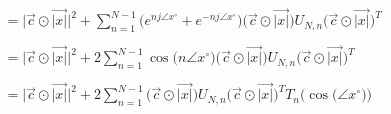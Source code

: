 \documentclass{article}
\begin{document}
\begin{align*}
                          &= \Big|\vec{c} \odot \vec{|x|}\Big|^{2} + \sum_{n=1}^{N - 1}\Big(e^{nj\angle{x}^{\circ}} + e^{-nj\angle{x}^{\circ}}\Big)\Big(\vec{c} \odot \vec{|x|}\Big)U_{N, n}\Big(\vec{c} \odot \vec{|x|}\Big)^{T} \\ \\
                          &= \Big|\vec{c} \odot \vec{|x|}\Big|^{2} + 2\sum_{n=1}^{N - 1}\cos\big(n\angle{x}^{\circ}\big)\Big(\vec{c} \odot \vec{|x|}\Big)U_{N, n}\Big(\vec{c} \odot \vec{|x|}\Big)^{T} \\ \\
                          &= \Big|\vec{c} \odot \vec{|x|}\Big|^{2} + 2\sum_{n=1}^{N - 1}\Big(\vec{c} \odot \vec{|x|}\Big)U_{N, n}\Big(\vec{c} \odot \vec{|x|}\Big)^{T}T_{n}\Big(\cos\big(\angle{x}^{\circ}\big)\Big)
\end{align*}
\end{document}
